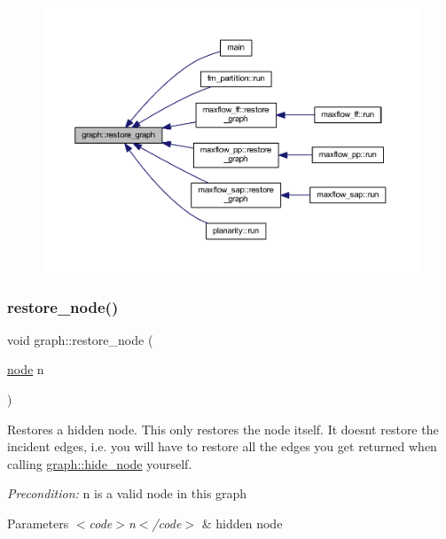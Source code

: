 \begin{figure}[H]
\begin{center}
\leavevmode
\includegraphics[width=350pt]{classgraph_a53e2a5505fa6427587e12d66e4a86cec_icgraph}
\end{center}
\end{figure}
\mbox{\label{classgraph_ab57aab79e649cc275052b7decbdd03ec}} 
\subsubsection{\texorpdfstring{restore\+\_\+node()}{restore\_node()}}
{\footnotesize\ttfamily void graph\+::restore\+\_\+node (\begin{DoxyParamCaption}\item[{\mbox{\hyperlink{classnode}{node}}}]{n }\end{DoxyParamCaption})\hspace{0.3cm}{\ttfamily [inherited]}}

Restores a hidden node. This only restores the node itself. It doesn\textquotesingle{}t restore the incident edges, i.\+e. you will have to restore all the edges you get returned when calling \mbox{\hyperlink{classgraph_a214618b5e3c02695779350532506e225}{graph\+::hide\+\_\+node}} yourself. ~\newline
 

{\itshape Precondition\+:} {\ttfamily n} is a valid node in this graph 
\begin{DoxyParams}{Parameters}
{\em $<$code$>$n$<$/code$>$} & hidden node \\
\hline
\end{DoxyParams}


